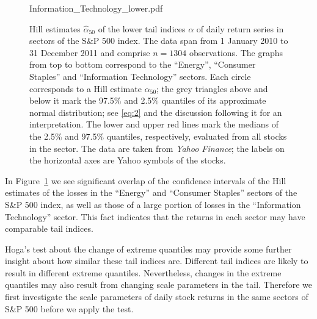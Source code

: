 \documentclass[11pt,a4]{amsart}
\newcommand{\1}{{\mathbf 1}}
\begin{document}
\begin{figure}[htb!]
\begin{minipage}{1.0\linewidth}
    {Information_Technology_lower.pdf}
  \end{minipage}
  \caption{\small Hill estimates $\hat \alpha_{50}$ of the lower tail indices $\alpha$ of
    daily return series in sectors of the S\&P 500
    index. The data span
    from 1 January 2010 to 31 December 2011 and comprise $n=1304$ observations.
The graphs from top to bottom correspond to the ``Energy'',
    ``Consumer Staples'' and ``Information Technology'' sectors.
    Each circle corresponds to a Hill estimate $\hat\alpha_{50}$; the grey
    triangles above and below it mark the 97.5\% and 2.5\% quantiles
    of its approximate normal distribution; see \eqref{eq:2} and the discussion following it for an 
interpretation.
    The lower and upper red lines mark the medians of the 2.5\% 
    and 97.5\% quantiles, respectively, evaluated from all stocks in the sector.
    The data are taken from {\it Yahoo Finance}; the labels on
    the horizontal axes are Yahoo symbols of the stocks. 
  }\label{fig:1}
\end{figure}

In Figure~\ref{fig:1} we see significant overlap of the confidence intervals of the Hill
estimates of the losses in the ``Energy'' and ``Consumer Staples''
sectors of the S\&P 500 index, as well as those of a 
large portion of losses in the ``Information Technology'' sector.
This fact indicates that the returns in each sector may 
have comparable tail indices.
\par
Hoga's \cite{hoga:2016} test about the change of extreme quantiles
may provide some further insight about how similar these tail indices are.
Different tail indices are likely to result in different
extreme quantiles. Nevertheless, changes in the extreme quantiles may also
result from changing scale parameters in the tail. Therefore  we first investigate the scale
parameters of daily stock returns in the same sectors of S\&P 500 before we apply the test.
\end{document}
